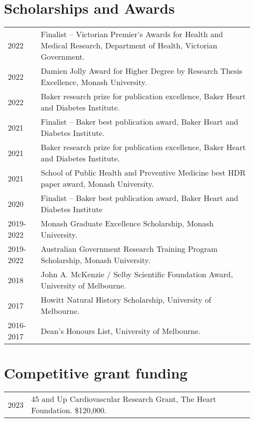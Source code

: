 \documentclass[11pt]{article}
\begin{document}
\section*{Scholarships and Awards}
\begin{tabular}{p{2cm}p{14cm}}
2022 & Finalist – Victorian Premier's Awards for Health and Medical Research, Department of Health, Victorian Government. \\
2022 & Damien Jolly Award for Higher Degree by Research Thesis Excellence, Monash University. \\
2022 & Baker research prize for publication excellence, Baker Heart and Diabetes Institute. \\
2021 & Finalist – Baker best publication award, Baker Heart and Diabetes Institute. \\
2021 & Baker research prize for publication excellence, Baker Heart and Diabetes Institute. \\
2021 & School of Public Health and Preventive Medicine best HDR paper award, Monash University. \\
2020 & Finalist – Baker best publication award, Baker Heart and Diabetes Institute \\
2019-2022 & Monash Graduate Excellence Scholarship, Monash University. \\
2019-2022 & Australian Government Research Training Program Scholarship, Monash University. \\
2018 & John A. McKenzie / Selby Scientific Foundation Award, University of Melbourne. \\
2017 & Howitt Natural History Scholarship, University of Melbourne. \\
2016-2017 & Dean's Honours List, University of Melbourne. \\
\end{tabular}

\section*{Competitive grant funding}
\begin{tabular}{p{2cm}p{14cm}}
2023 & 45 and Up Cardiovascular Research Grant, The Heart Foundation. \$120,000. \\
\end{tabular}



\clearpage
{}

\clearpage
\end{document}
